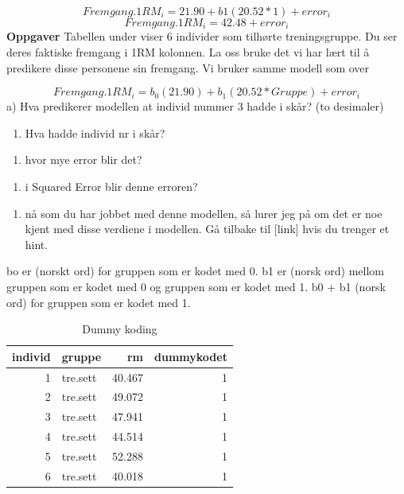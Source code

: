 \documentclass[
]{book}
\providecommand{\tightlist}{%
  \setlength{\itemsep}{0pt}\setlength{\parskip}{0pt}}
\begin{document}
\[
Fremgang.1RM_i = 21.90 + b1(20.52*1) + error_i
\]
\[
Fremgang.1RM_i = 42.48 + error_i
\]
\textbf{Oppgaver}
Tabellen under viser 6 individer som tilhørte treningsgruppe. Du ser deres faktiske fremgang i 1RM kolonnen. La oss bruke det vi har lært til å predikere disse personene sin fremgang. Vi bruker samme modell som over

\[
Fremgang.1RM_i = b_0(21.90) + b_1(20.52*Gruppe) + error_i
\]
a) Hva predikerer modellen at individ nummer 3 hadde i skår? (to desimaler)

\begin{enumerate}
\def\labelenumi{\alph{enumi})}
\setcounter{enumi}{1}
\tightlist
\item
  Hva hadde individ nr i skår?
\end{enumerate}

\begin{enumerate}
\def\labelenumi{\alph{enumi})}
\setcounter{enumi}{2}
\tightlist
\item
  hvor mye error blir det?
\end{enumerate}

\begin{enumerate}
\def\labelenumi{\alph{enumi})}
\setcounter{enumi}{3}
\tightlist
\item
  i Squared Error blir denne erroren?
\end{enumerate}

\begin{enumerate}
\def\labelenumi{\alph{enumi})}
\setcounter{enumi}{4}
\tightlist
\item
  nå som du har jobbet med denne modellen, så lurer jeg på om det er noe kjent med disse verdiene i modellen. Gå tilbake til {[}link{]} hvis du trenger et hint.
\end{enumerate}

bo er (norskt ord) for gruppen som er kodet med 0. b1 er (norsk ord) mellom gruppen som er kodet med 0 og gruppen som er kodet med 1. b0 + b1 (norsk ord) for gruppen som er kodet med 1.

\begin{table}

\caption{\label{tab:unnamed-chunk-10}Dummy koding}
\centering
\begin{tabular}[t]{r|l|r|r}
\hline
individ & gruppe & rm & dummykodet\\
\hline
1 & tre.sett & 40.467 & 1\\
\hline
2 & tre.sett & 49.072 & 1\\
\hline
3 & tre.sett & 47.941 & 1\\
\hline
4 & tre.sett & 44.514 & 1\\
\hline
5 & tre.sett & 52.288 & 1\\
\hline
6 & tre.sett & 40.018 & 1\\
\hline
\end{tabular}
\end{table}
\end{document}
